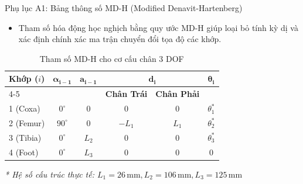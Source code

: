 \documentclass[10pt,aspectratio=169]{beamer}
\begin{document}
\begin{frame}{Phụ lục A1: Bảng thông số MD-H (Modified Denavit-Hartenberg)}
  \begin{itemize}
      \item Tham số hóa động học nghịch bằng quy ước MD-H giúp loại bỏ tính kỳ dị và xác định chính xác ma trận chuyển đổi tọa độ các khớp.
  \end{itemize}
  \vspace{0.2cm}
  \begin{table}[htbp]
      \centering
      \caption{Tham số MD-H cho cơ cấu chân 3 DOF}
      \vspace{0.1cm}
      \def\arraystretch{1.4}
      \begin{tabular}{l c c c c c}
          \toprule
          \textbf{Khớp ($i$)} & $\boldsymbol{\alpha_{i-1}}$ & $\boldsymbol{a_{i-1}}$ & \multicolumn{2}{c}{$\boldsymbol{d_i}$} & $\boldsymbol{\theta_i}$ \\
          \cmidrule(lr){4-5}
          & & & \textbf{Chân Trái} & \textbf{Chân Phải} & \\
          \midrule
          1 (Coxa)  & $0^\circ$ & $0$   & $0$    & $0$   & $\theta_1^*$ \\
          2 (Femur) & $90^\circ$& $0$   & $-L_1$ & $L_1$ & $\theta_2^*$ \\
          3 (Tibia) & $0^\circ$ & $L_2$ & $0$    & $0$   & $\theta_3^*$ \\
          4 (Foot)  & $0^\circ$ & $L_3$ & $0$    & $0$   & $0$ \\
          \bottomrule
      \end{tabular}
  \end{table}
  {\small \textit{* Hệ số cấu trúc thực tế: $L_1=26\,\text{mm}, L_2=106\,\text{mm}, L_3=125\,\text{mm}$}}
\end{frame}
\end{document}
